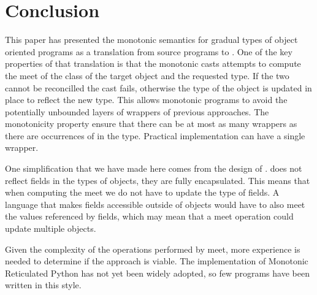 \documentclass[sigconf]{acmart}
\begin{document}
\section{Conclusion}

This paper has presented the monotonic semantics for gradual types of object
oriented programs as a translation from source programs to \kafka.  One of
the key properties of that translation is that the monotonic casts attempts
to compute the meet of the class of the target object and the requested
type.  If the two cannot be reconcilled the cast fails, otherwise the type
of the object is updated in place to reflect the new type. This allows
monotonic programs to avoid the potentially unbounded layers of wrappers of
previous approaches. The monotonicity property ensure that there can be at
most as many wrappers as there are occurrences of \any in the
type. Practical implementation can have a single wrapper.

One simplification that we have made here comes from the design of
\kafka. \kafka does not reflect fields in the types of objects, they are
fully encapsulated.  This means that when computing the meet we do not have
to update the type of fields. A language that makes fields accessible
outside of objects would have to also meet the values referenced by fields,
which may mean that a meet operation could update multiple objects.

Given the complexity of the operations performed by meet, more experience is
needed to determine if the approach is viable. The implementation of
Monotonic Reticulated Python has not yet been widely adopted, so few programs 
have been written in this style.



\end{document}
